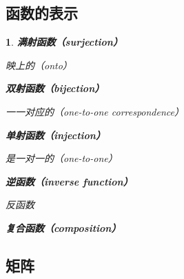 \documentclass[UTF8]{report}
\theoremstyle{MyLineTheoremStyle} %
\theoremstyle{MyBlockTheoremStyle} %
\theoremstyle{MySubsubsectionStyle} %
\newtheorem{definition}{}
\begin{document}
\subsection{函数的表示}

\begin{definition}
    \textbf{满射函数（surjection）}\par
    映上的（onto）\par

    \textbf{双射函数（bijection）}\par
    一一对应的（one-to-one correspondence）\par

    \textbf{单射函数（injection）}\par
    是一对一的（one-to-one）\par

    \textbf{逆函数（inverse function）}\par
    反函数\par

    \textbf{复合函数（composition）}\par
\end{definition}




\subsection{矩阵}
\end{document}
